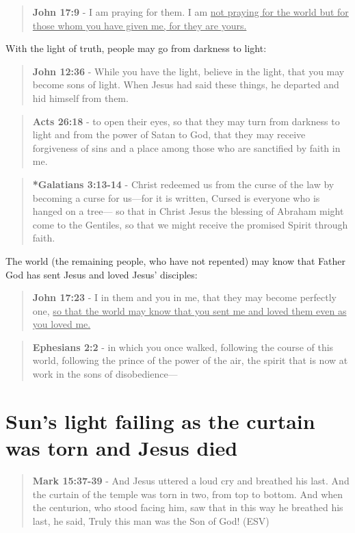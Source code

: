 \documentclass[11pt]{article}
\begin{document}
\begin{quote}
\textbf{John 17:9} - I am praying for them. I am \uline{not praying for the world but for those whom you have given me, for they are yours.}
\end{quote}

With the light of truth, people may go from darkness to light:

\begin{quote}
\textbf{John 12:36} - While you have the light, believe in the light, that you may become sons of light. When Jesus had said these things, he departed and hid himself from them.
\end{quote}

\begin{quote}
\textbf{Acts 26:18} - to open their eyes, so that they may turn from darkness to light and from the power of Satan to God, that they may receive forgiveness of sins and a place among those who are sanctified by faith in me.
\end{quote}

\begin{quote}
\textbf{*Galatians 3:13-14} - Christ redeemed us from the curse of the law by becoming a curse for us—for it is written, Cursed is everyone who is hanged on a tree— so that in Christ Jesus the blessing of Abraham might come to the Gentiles, so that we might receive the promised Spirit through faith.
\end{quote}

The world (the remaining people, who have not repented) may know that Father God has sent Jesus and loved Jesus' disciples:

\begin{quote}
\textbf{John 17:23} - I in them and you in me, that they may become perfectly one, \uline{so that the world may know that you sent me and loved them even as you loved me.}
\end{quote}

\begin{quote}
\textbf{Ephesians 2:2} - in which you once walked, following the course of this world, following the prince of the power of the air, the spirit that is now at work in the sons of disobedience—
\end{quote}

\section{Sun's light failing as the curtain was torn and Jesus died}
\label{sec:orgf9c7ebe}
\begin{quote}
\textbf{Mark 15:37-39} - And Jesus uttered a loud cry and breathed his last. And the curtain of the temple was torn in two, from top to bottom. And when the centurion, who stood facing him, saw that in this way he breathed his last, he said, Truly this man was the Son of God! (ESV)
\end{quote}
\end{document}
